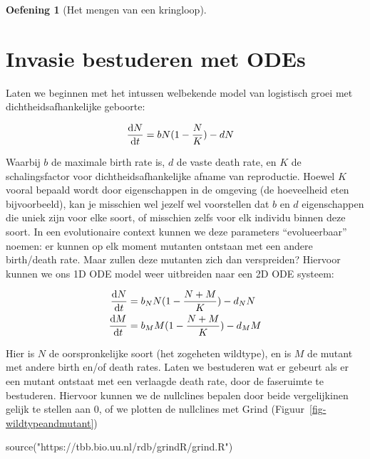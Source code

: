 \documentclass[
  a4paper,
]{scrbook}
\newenvironment{Shaded}{\begin{snugshade}}{\end{snugshade}}
\newcommand{\FunctionTok}[1]{\textcolor[rgb]{0.28,0.35,0.67}{#1}}
\newcommand{\NormalTok}[1]{\textcolor[rgb]{0.00,0.23,0.31}{#1}}
\newcommand{\StringTok}[1]{\textcolor[rgb]{0.13,0.47,0.30}{#1}}
\theoremstyle{definition}
\newtheorem{exercise}{Oefening}[chapter]
\theoremstyle{remark}
\begin{document}
\begin{exercise}[Het mengen van een
kringloop]
\section{Invasie bestuderen met ODEs}\label{invasie-bestuderen-met-odes}

Laten we beginnen met het intussen welbekende model van logistisch groei
met dichtheidsafhankelijke geboorte:

\begin{align*}
\mathchoice{\frac{\mathrm{d}N}
{\mathrm{d}t}}{\mathrm{d}N/\mathrm{d}t}
{\mathrm{d}N/\mathrm{d}t}
{\mathrm{d}N/\mathrm{d}t} &= bN(1-\frac{N}{K}) - dN
\end{align*}

Waarbij \(b\) de maximale birth rate is, \(d\) de vaste death rate, en
\(K\) de schalingsfactor voor dichtheidsafhankelijke afname van
reproductie. Hoewel \(K\) vooral bepaald wordt door eigenschappen in de
omgeving (de hoeveelheid eten bijvoorbeeld), kan je misschien wel jezelf
wel voorstellen dat \(b\) en \(d\) eigenschappen die uniek zijn voor
elke soort, of misschien zelfs voor elk individu binnen deze soort. In
een evolutionaire context kunnen we deze parameters ``evolueerbaar''
noemen: er kunnen op elk moment mutanten ontstaan met een andere
birth/death rate. Maar zullen deze mutanten zich dan verspreiden?
Hiervoor kunnen we ons 1D ODE model weer uitbreiden naar een 2D ODE
systeem:

\begin{align*}
\mathchoice{\frac{\mathrm{d}N}
{\mathrm{d}t}}{\mathrm{d}N/\mathrm{d}t}
{\mathrm{d}N/\mathrm{d}t}
{\mathrm{d}N/\mathrm{d}t} &= b_NN(1-\frac{N+M}{K}) - d_NN\\
\mathchoice{\frac{\mathrm{d}M}
{\mathrm{d}t}}{\mathrm{d}M/\mathrm{d}t}
{\mathrm{d}M/\mathrm{d}t}
{\mathrm{d}M/\mathrm{d}t} &= b_MM(1-\frac{N+M}{K}) - d_MM
\end{align*}

Hier is \(N\) de oorspronkelijke soort (het zogeheten wildtype), en is
\(M\) de mutant met andere birth en/of death rates. Laten we bestuderen
wat er gebeurt als er een mutant ontstaat met een verlaagde death rate,
door de faseruimte te bestuderen. Hiervoor kunnen we de nullclines
bepalen door beide vergelijkinen gelijk te stellen aan \(0\), of we
plotten de nullclines met Grind (Figuur~\ref{fig-wildtypeandmutant})

\begin{Shaded}
\begin{Highlighting}[]
\FunctionTok{source}\NormalTok{(}\StringTok{"https://tbb.bio.uu.nl/rdb/grindR/grind.R"}\NormalTok{)}


\end{Highlighting}
\end{Shaded}
\end{exercise}
\end{document}
